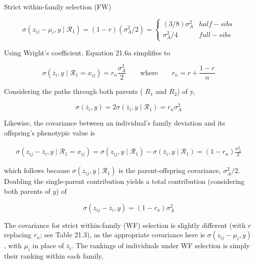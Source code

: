 \documentclass{article}
\begin{document}
Strict within-family selection (FW)

\begin{equation}
\sigma(z_{ij}-\mu_{i},y\mid\mathcal{R}_{1})=(1-r)\left(\sigma_{A}^{2}/2\right)=\left\{\begin{array}{ll}(3/8)\sigma_{A}^{2}&half-sibs\\\sigma_{A}^{2}/4&full-sibs\end{array}\right.
\end{equation}

Using Wright's coefficient, Equation 21.6a simplifies to

\begin{equation}
\sigma(\overline{z}_{i},y\mid\mathcal{R}_{1}=x_{ij})=r_{n}\frac{\sigma_{A}^{2}}{2}\qquad\mathrm{where}\qquad r_{n}=r+\frac{1-r}{n}
\tag{21.6b}
\label{eq:21_6b}
\end{equation}

Considering the paths through both parents ( $ R_{1} $ and  $ R_{2} $) of y,

\begin{equation}
\sigma(\overline{z}_{i},y)=2\sigma(\overline{z}_{i},y\mid\mathcal{R}_{1})=r_{n}\sigma_{A}^{2}
\tag{21.6c}
\label{eq:21_6c}
\end{equation}

Likewise, the covariance between an individual’s family deviation and its offspring’s phenotypic value is

\begin{equation}
\begin{align*}\sigma(z_{ij}-\overline{z}_i,y\mid\mathcal{R}_1=x_{ij})=\sigma(z_{ij},y\mid\mathcal{R}_1)-\sigma(\overline{z}_i,y\mid\mathcal{R}_1)=(1-r_n)\frac{\sigma_A^2}{2}\end{align*}
\tag{21.7a}
\label{eq:21_7a}
\end{equation}

which follows because  $ \sigma(z_{ij}, y \mid \mathcal{R}_1) $ is the parent-offspring covariance,  $ \sigma_A^2 / 2 $. Doubling the single-parent contribution yields a total contribution (considering both parents of  $ y $) of

\begin{equation}
\sigma(z_{ij}-\overline{z}_{i},y)=(1-r_{n})\sigma_{A}^{2}
\tag{21.7b}
\label{eq:21_7b}
\end{equation}

The covariance for strict within-family (WF) selection is slightly different (with $r$ replacing $r_n$; see Table 21.3), as the appropriate covariance here is $\sigma(z_{ij} - \mu_i, y)$, with $\mu_i$ in place of $\overline{z}_i$. The rankings of individuals under WF selection is simply their ranking within each family,
\end{document}
